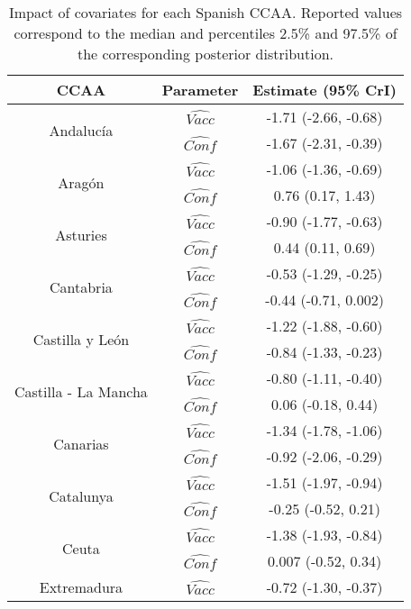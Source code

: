 \documentclass{bmcart}
\begin{document}
\begin{backmatter}
\begin{table}[h]
\small\sf\centering
\caption{Impact of covariates for each Spanish CCAA. Reported values correspond to the median and percentiles 2.5\% and 97.5\% of the corresponding posterior distribution.\label{tab:ccaa_est2}}
\begin{tabular}{ccc}
\hline
CCAA & Parameter & Estimate (95\% CrI)\\
\hline
\multirow{2}{*}{Andaluc\'ia}  & $\hat{Vacc}$  & -1.71 (-2.66, -0.68) \\
                              & $\hat{Conf}$  & -1.67 (-2.31, -0.39) \\
\hline
\multirow{2}{*}{Arag\'on}    & $\hat{Vacc}$  & -1.06 (-1.36, -0.69) \\
                             & $\hat{Conf}$  & 0.76 (0.17, 1.43) \\
\hline
\multirow{2}{*}{Asturies}    & $\hat{Vacc}$  & -0.90 (-1.77, -0.63) \\
                             & $\hat{Conf}$  & 0.44 (0.11, 0.69) \\
\hline
\multirow{2}{*}{Cantabria}    & $\hat{Vacc}$  & -0.53 (-1.29, -0.25) \\
                              & $\hat{Conf}$  & -0.44 (-0.71, 0.002) \\
\hline
\multirow{2}{*}{Castilla y Le\'on}    & $\hat{Vacc}$  & -1.22 (-1.88, -0.60) \\
                                      & $\hat{Conf}$  & -0.84 (-1.33, -0.23) \\
\hline
\multirow{2}{*}{Castilla - La Mancha}    & $\hat{Vacc}$  & -0.80 (-1.11, -0.40) \\
                                         & $\hat{Conf}$  & 0.06 (-0.18, 0.44) \\
\hline
\multirow{2}{*}{Canarias}    & $\hat{Vacc}$  & -1.34 (-1.78, -1.06) \\
                              & $\hat{Conf}$ & -0.92 (-2.06, -0.29) \\
\hline
\multirow{2}{*}{Catalunya}    & $\hat{Vacc}$  & -1.51 (-1.97, -0.94) \\
                              & $\hat{Conf}$  & -0.25 (-0.52, 0.21) \\
\hline
\multirow{2}{*}{Ceuta}    & $\hat{Vacc}$  & -1.38 (-1.93, -0.84) \\
                          & $\hat{Conf}$  & 0.007 (-0.52, 0.34) \\
\hline
\multirow{2}{*}{Extremadura}    & $\hat{Vacc}$  & -0.72 (-1.30, -0.37) \\

\end{tabular}
\end{table}
\end{backmatter}
\end{document}
